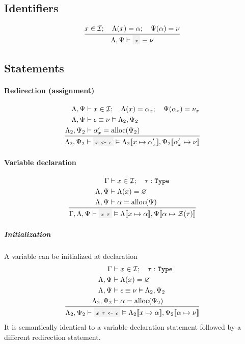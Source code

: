 \subsection{Identifiers}

\[
	\oprule{
		x \in \Id \semiq \EnvLoc(x) = \addr \semiq \EnvStore(\addr) = \val
	}{
		\EnvLoc,\EnvStore\then \code{$x$} \eval \val
	}
\]

\subsection{Statements}

\paragraph{Redirection (assignment)}

\[
	\oprule[aligned]{
		\EnvLoc,\EnvStore     &\then x \in \Id \semiq \EnvLoc(x) = \addr_x \semiq \EnvStore(\addr_x) = \val_x \\*
		\EnvLoc,\EnvStore     &\then \expr \eval \val \Then \EnvLoc_2,\EnvStore_2 \\*
		\EnvLoc_2,\EnvStore_2 &\then \addr_x' = \alloc(\EnvStore_2) \\*
	}{
		\EnvLoc_2,\EnvStore_2\then \code{$x$ <- $\expr$} \Then \EnvLoc_2\env{x \mapsto \addr_x'},\EnvStore_2\env{\addr_x' \mapsto \val}
	}
\]

\paragraph{Variable declaration}

\[
	\oprule[aligned]{
		\EnvSym           &\then x \in \Id \semiq \tau : \Type \\*
		\EnvLoc,\EnvStore &\then \EnvLoc(x) = \varnothing \\*
		\EnvLoc,\EnvStore &\then \addr = \alloc(\EnvStore)
	}{
		\EnvSym,\EnvLoc,\EnvStore \then \code{$x$ $\tau$}
		\Then \EnvLoc\env{x \mapsto \addr},\EnvStore\env{\addr \mapsto \Zero(\tau)}
	}
\]

\subparagraph{Initialization} A variable can be initialized at declaration
\[
	\oprule[aligned]{
		\EnvSym               &\then x \in \Id \semiq \tau : \Type \\*
		\EnvLoc,\EnvStore     &\then \EnvLoc(x) = \varnothing \\*
		\EnvLoc,\EnvStore     &\then \expr \eval \val \Then \EnvLoc_2,\EnvStore_2 \\*
		\EnvLoc_2,\EnvStore_2 &\then \addr = \alloc(\EnvStore_2) \\*
	}{
		\EnvLoc_2,\EnvStore_2 \then \code{$x$ $\tau$ <- $\expr$}
		\Then \EnvLoc_2\env{x \mapsto \addr},\EnvStore_2\env{\addr \mapsto \val}
	}
\]
It is semantically identical to a variable declaration statement followed by a
different redirection statement.


